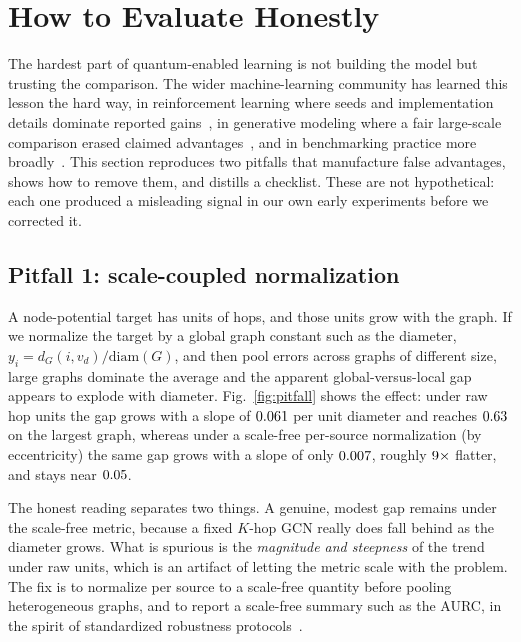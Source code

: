 \section{How to Evaluate Honestly}
\label{sec:pitfalls}

The hardest part of quantum-enabled learning is not building the model but trusting
the comparison. The wider machine-learning community has learned this lesson the hard
way, in reinforcement learning where seeds and implementation details dominate
reported gains~\cite{henderson2018matters}, in generative modeling where a fair
large-scale comparison erased claimed advantages~\cite{lucic2018gans}, and in
benchmarking practice more broadly~\cite{pineau2021reproducibility,dehghani2021lottery}.
This section reproduces two pitfalls that manufacture false advantages, shows how to
remove them, and distills a checklist. These are not hypothetical: each one produced a
misleading signal in our own early experiments before we corrected it.

\subsection{Pitfall 1: scale-coupled normalization}
A node-potential target has units of hops, and those units grow with the graph. If we
normalize the target by a global graph constant such as the diameter,
$y_i=d_G(i,v_d)/\mathrm{diam}(G)$, and then pool errors across graphs of different
size, large graphs dominate the average and the apparent global-versus-local gap
appears to explode with diameter. Fig.~\ref{fig:pitfall} shows the effect: under raw
hop units the gap grows with a slope of $0.061$ per unit diameter and reaches
$0.63$ on the largest graph, whereas under a scale-free per-source normalization
(by eccentricity) the same gap grows with a slope of only $0.007$, roughly
$9\times$ flatter, and stays near $0.05$.

The honest reading separates two things. A genuine, modest gap remains under the
scale-free metric, because a fixed $K$-hop GCN really does fall behind as the diameter
grows. What is spurious is the \emph{magnitude and steepness} of the trend under
raw units, which is an artifact of letting the metric scale with the problem. The fix
is to normalize per source to a scale-free quantity before pooling heterogeneous
graphs, and to report a scale-free summary such as the AURC, in the spirit of
standardized robustness protocols~\cite{hendrycks2019corruptions}.

